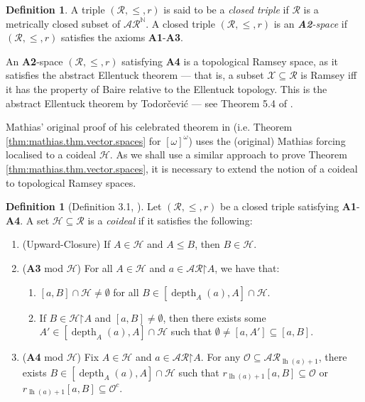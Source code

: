 \documentclass[11pt,reqno]{amsart}
\theoremstyle{plain}
\numberwithin{equation}{section}
\theoremstyle{definition}
\newtheorem{definition}[theorem]{Definition}
\newcommand{\func}{\operatorname}
\newcommand{\N}{\mathbb{N}}
\newcommand{\cal}{\mathcal}
\newcommand{\restrictedto}{\mathord{\upharpoonright}}
\newcommand{\X}{\cal{X}}
\renewcommand{\H}{\cal{H}}
\newcommand{\lh}{\func{lh}}
\renewcommand{\O}{\cal{O}}
\newcommand{\depth}{\func{depth}}
\begin{document}
\begin{definition}
    A triple $(\cal{R},\leq,r)$ is said to be a \emph{closed triple} if $\cal{R}$ is a metrically closed subset of $\cal{AR}^\N$. A closed triple $(\cal{R},\leq,r)$ is an \emph{\textbf{A2}-space} if $(\cal{R},\leq,r)$ satisfies the axioms \textbf{A1}-\textbf{A3}.
\end{definition}

An \textbf{A2}-space $(\cal{R},\leq,r)$ satisfying \textbf{A4} is a topological Ramsey space, as it satisfies the abstract Ellentuck theorem --- that is, a subset $\X \subseteq \cal{R}$ is Ramsey iff it has the property of Baire relative to the Ellentuck topology. This is the abstract Ellentuck theorem by Todor\v{c}evi\'{c} --- see Theorem 5.4 of \cite{T10}.

Mathias' original proof of his celebrated theorem in \cite{M77} (i.e. Theorem \ref{thm:mathias.thm.vector.spaces} for $[\omega]^\omega$) uses the (original) Mathias forcing localised to a coideal $\H$. As we shall use a similar approach to prove Theorem \ref{thm:mathias.thm.vector.spaces}, it is necessary to extend the notion of a coideal to topological Ramsey spaces. 

\begin{definition}[Definition 3.1, \cite{DMN15}]
\label{def:coideal}
    Let $(\cal{R},\leq,r)$ be a closed triple satisfying \textbf{A1}-\textbf{A4}. A set $\H \subseteq \cal{R}$ is a \emph{coideal} if it satisfies the following:
    \begin{enumerate}
        \item (Upward-Closure) If $A \in \H$ and $A \leq B$, then $B \in \H$.
        
        \item (\textbf{A3} mod $\H$) For all $A \in \H$ and $a \in \cal{AR}\restrictedto A$, we have that:
        \begin{enumerate}
            \item $[a,B] \cap \H \neq \emptyset$ for all $B \in [\depth_A(a),A] \cap \H$.
            
            \item If $B \in \H \restrictedto A$ and $[a,B] \neq \emptyset$, then there exists some $A' \in [\depth_A(a),A] \cap \H$ such that $\emptyset \neq [a,A'] \subseteq [a,B]$.
        \end{enumerate}
        
        \item (\textbf{A4} mod $\H$) Fix $A \in \H$ and $a \in \cal{AR} \restrictedto A$. For any $\O \subseteq \cal{AR}_{\lh(a)+1}$, there exists $B \in [\depth_A(a),A] \cap \H$ such that $r_{\lh(a)+1}[a,B] \subseteq \O$ or $r_{\lh(a)+1}[a,B] \subseteq \O^c$.
    \end{enumerate}
\end{definition}
\end{document}

